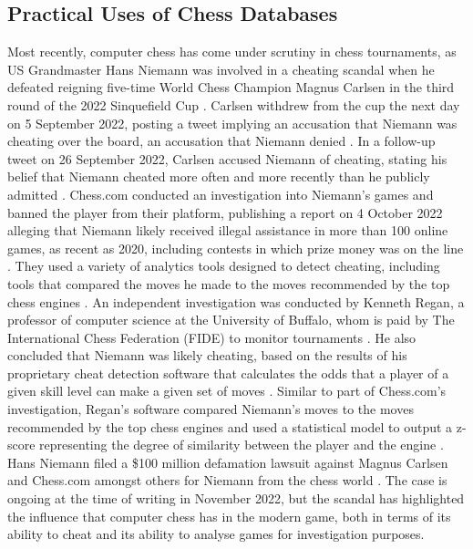 \documentclass[%
 superscriptaddress,
showpacs,preprintnumbers,
 amsmath,
 amssymb,
 aps,
 pra,
showkeys,
onecolumn,
notitlepage,
11pt,
tightenlines      %
]{revtex4-1}
\begin{document}
\subsection{Practical Uses of Chess Databases}
Most recently, computer chess has come under scrutiny in chess tournaments, as US Grandmaster Hans Niemann was involved in a cheating scandal when he defeated reigning five-time World Chess Champion Magnus Carlsen in the third round of the 2022 Sinquefield Cup \cite{niemannDefeatsCarlsen}. Carlsen withdrew from the cup the next day on 5 September 2022, posting a tweet implying an accusation that Niemann was cheating over the board, an accusation that Niemann denied \cite{niemannCheatingAllegations}. In a follow-up tweet on 26 September 2022, Carlsen accused Niemann of cheating, stating his belief that Niemann cheated more often and more recently than he publicly admitted \cite{niemannCheatingAllegations2}. Chess.com conducted an investigation into Niemann's games and banned the player from their platform, publishing a report on 4 October 2022 alleging that Niemann likely received illegal assistance in more than 100 online games, as recent as 2020, including contests in which prize money was on the line \cite{niemannCheatingChessComReport}. They used a variety of analytics tools designed to detect cheating, including tools that compared the moves he made to the moves recommended by the top chess engines \cite{niemannCheatingChessComReport}. An independent investigation was conducted by Kenneth Regan, a professor of computer science at the University of Buffalo, whom is paid by The International Chess Federation (FIDE) to monitor tournaments \cite{niemannCheatingReganReport}. He also concluded that Niemann was likely cheating, based on the results of his proprietary cheat detection software that calculates the odds that a player of a given skill level can make a given set of moves \cite{niemannCheatingReganReport}. Similar to part of Chess.com's investigation, Regan's software compared Niemann's moves to the moves recommended by the top chess engines and used a statistical model to output a z-score representing the degree of similarity between the player and the engine \cite{niemannCheatingReganReport}. Hans Niemann filed a \$100 million defamation lawsuit against Magnus Carlsen and Chess.com amongst others for  Niemann from the chess world \cite{niemannCheatingDefamationLawsuit}. The case is ongoing at the time of writing in November 2022, but the scandal has highlighted the influence that computer chess has in the modern game, both in terms of its ability to cheat and its ability to analyse games for investigation purposes.
\end{document}
